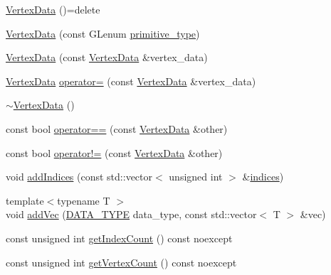 \begin{DoxyCompactItemize}
\item 
\hyperlink{class_graphics_1_1_vertex_data_a5f7a4162413a61c94cba76b528c17cc6}{Vertex\+Data} ()=delete
\item 
\hyperlink{class_graphics_1_1_vertex_data_aab133d7bc7567df43e6055f81e2ed23c}{Vertex\+Data} (const G\+Lenum \hyperlink{class_graphics_1_1_vertex_data_a3940832a3699c42ea2d9f4e0943653aa}{primitive\+\_\+type})
\item 
\hyperlink{class_graphics_1_1_vertex_data_aaf7331434454cb253f5ad5b86a8eec99}{Vertex\+Data} (const \hyperlink{class_graphics_1_1_vertex_data}{Vertex\+Data} \&vertex\+\_\+data)
\item 
\hyperlink{class_graphics_1_1_vertex_data}{Vertex\+Data} \hyperlink{class_graphics_1_1_vertex_data_abda73a49d1b280ee091afd53973c3448}{operator=} (const \hyperlink{class_graphics_1_1_vertex_data}{Vertex\+Data} \&vertex\+\_\+data)
\item 
\hyperlink{class_graphics_1_1_vertex_data_a59b5214fe3d6b6f9425032c86abf65cb}{$\sim$\+Vertex\+Data} ()
\item 
const bool \hyperlink{class_graphics_1_1_vertex_data_ad58ef98925908992fcd3ff090f57693f}{operator==} (const \hyperlink{class_graphics_1_1_vertex_data}{Vertex\+Data} \&other)
\item 
const bool \hyperlink{class_graphics_1_1_vertex_data_ac03511a02af7005757f60783b73fc51f}{operator!=} (const \hyperlink{class_graphics_1_1_vertex_data}{Vertex\+Data} \&other)
\item 
void \hyperlink{class_graphics_1_1_vertex_data_a9d7dfbf44faa4ebeeb052d9a49ec72c4}{add\+Indices} (const std\+::vector$<$ unsigned int $>$ \&\hyperlink{class_graphics_1_1_vertex_data_a9b777aa4bf035e805b2957fbcd158842}{indices})
\item 
{\footnotesize template$<$typename T $>$ }\\void \hyperlink{class_graphics_1_1_vertex_data_a1432af05a48b67a06c711910bb495c6e}{add\+Vec} (\hyperlink{class_graphics_1_1_vertex_data_a50e88236939dc2a3ec4df7aeb728620e}{D\+A\+T\+A\+\_\+\+T\+Y\+P\+E} data\+\_\+type, const std\+::vector$<$ T $>$ \&vec)
\item 
const unsigned int \hyperlink{class_graphics_1_1_vertex_data_a0c58a46431db14740109e6cadb322e4e}{get\+Index\+Count} () const noexcept
\item 
const unsigned int \hyperlink{class_graphics_1_1_vertex_data_afc9fb219a54d93cc0796424bd9d1a7db}{get\+Vertex\+Count} () const noexcept
\item 

\end{DoxyCompactItemize}
